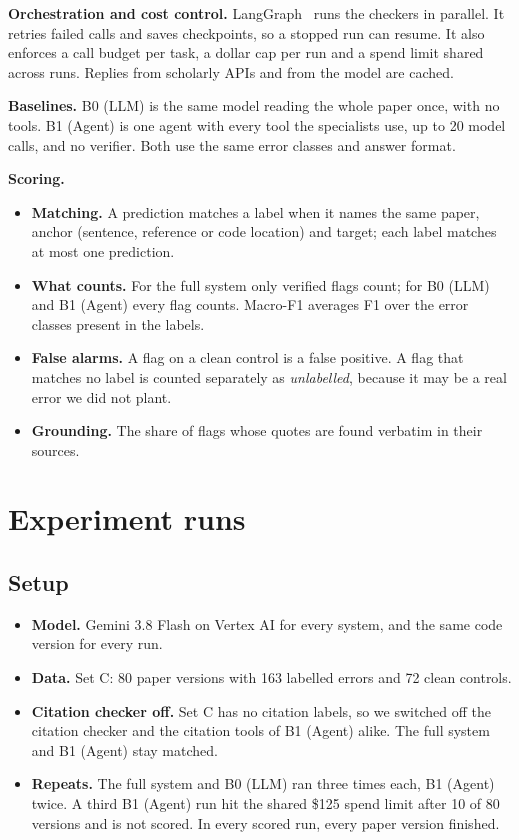 \documentclass[11pt,a4paper]{article}
\begin{document}
\textbf{Orchestration and cost control.} LangGraph~\cite{langgraph} runs the checkers in parallel.
It retries failed calls and saves checkpoints, so a stopped run can resume. It also enforces a call
budget per task, a dollar cap per run and a spend limit shared across runs. Replies from scholarly
APIs and from the model are cached.

\textbf{Baselines.} B0 (LLM) is the same model reading the whole paper once, with no tools. B1 (Agent) is one
agent with every tool the specialists use, up to 20 model calls, and no verifier. Both use the
same error classes and answer format.

\textbf{Scoring.}
\begin{itemize}
\item \textbf{Matching.} A prediction matches a label when it names the same paper, anchor
(sentence, reference or code location) and target; each label matches at most one prediction.
\item \textbf{What counts.} For the full system only verified flags count; for B0 (LLM) and B1 (Agent) every
flag counts. Macro-F1 averages F1 over the error classes present in the labels.
\item \textbf{False alarms.} A flag on a clean control is a false positive. A flag that matches no
label is counted separately as \emph{unlabelled}, because it may be a real error we did not plant.

\item \textbf{Grounding.} The share of flags whose quotes are found verbatim in their sources.
\end{itemize}

\section{Experiment runs}
\subsection{Setup}
\begin{itemize}
\item \textbf{Model.} Gemini 3.8 Flash on Vertex AI for every system, and the same code version for
every run.
\item \textbf{Data.} Set C: 80 paper versions with 163 labelled errors and 72 clean controls.
\item \textbf{Citation checker off.} Set C has no citation labels, so we switched off the citation
checker and the citation tools of B1 (Agent) alike. The full system and B1 (Agent) stay matched.
\item \textbf{Repeats.} The full system and B0 (LLM) ran three times each, B1 (Agent) twice. A third B1 (Agent) run hit
the shared \$125 spend limit after 10 of 80 versions and is not scored. In every scored run, every
paper version finished.
\end{itemize}
\end{document}
